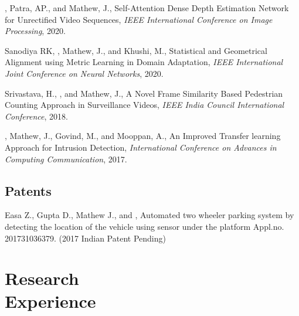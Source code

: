 \documentclass[mm]{simple_style}
\begin{document}
\begin{resume}
, Patra, AP., and Mathew, J., Self-Attention Dense Depth Estimation Network for Unrectified Video Sequences, \textit{IEEE International Conference on Image Processing}, 2020.

Sanodiya RK, , Mathew, J., and Khushi, M., Statistical and Geometrical Alignment using Metric Learning in Domain Adaptation, \textit{IEEE International Joint Conference on Neural Networks}, 2020.

Srivastava, H., , and Mathew, J., A Novel Frame Similarity Based Pedestrian Counting Approach in Surveillance Videos, \textit{IEEE India Council International Conference}, 2018.

, Mathew, J., Govind, M., and Mooppan, A., An Improved Transfer learning Approach for Intrusion Detection, \textit{International Conference on Advances in Computing  Communication}, 2017.\\
\halfsectionline
\vspace{-12mm}
\subsection{Patents}
\vspace{-2ex}

Easa Z., Gupta D., Mathew J., and , Automated two wheeler parking system by detecting the location of the vehicle using sensor under the platform Appl.no. 201731036379. (2017 Indian Patent Pending)

\vspace{-2ex}
\sectionline


\section{Research\\Experience}


\end{resume}
\end{document}
